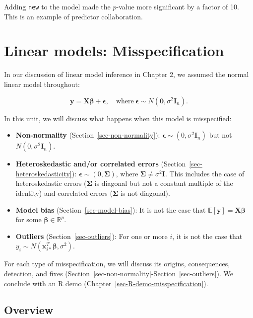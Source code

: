 \documentclass[
  11pt,
  letterpaper,
  oneside]{book}
\providecommand{\tightlist}{%
  \setlength{\itemsep}{0pt}\setlength{\parskip}{0pt}}\usepackage{longtable,booktabs,array}
\theoremstyle{definition}
\theoremstyle{plain}
\theoremstyle{plain}
\theoremstyle{plain}
\theoremstyle{remark}
\begin{document}
Adding \texttt{new} to the model made the \(p\)-value more significant
by a factor of 10. This is an example of predictor collaboration.

\part{Linear models: Misspecification}

In our discussion of linear model inference in Chapter 2, we assumed the
normal linear model throughout:

\[
\boldsymbol{y} = \boldsymbol{X} \boldsymbol{\beta} + \boldsymbol{\epsilon}, \quad \text{where} \ \boldsymbol{\epsilon} \sim N(\boldsymbol{0}, \sigma^2 \boldsymbol{I}_n).
\]

In this unit, we will discuss what happens when this model is
misspecified:

\begin{itemize}
\tightlist
\item
  \textbf{Non-normality} (Section~\ref{sec-non-normality}):
  \(\boldsymbol{\epsilon} \sim (0, \sigma^2 \boldsymbol{I}_n)\) but not
  \(N(0, \sigma^2 \boldsymbol{I}_n)\).
\item
  \textbf{Heteroskedastic and/or correlated errors}
  (Section~\ref{sec-heteroskedasticity}):
  \(\boldsymbol{\epsilon} \sim (0, \boldsymbol{\Sigma})\), where
  \(\boldsymbol{\Sigma} \neq \sigma^2 \boldsymbol{I}\). This includes
  the case of heteroskedastic errors (\(\boldsymbol{\Sigma}\) is
  diagonal but not a constant multiple of the identity) and correlated
  errors (\(\boldsymbol{\Sigma}\) is not diagonal).
\item
  \textbf{Model bias} (Section~\ref{sec-model-bias}): It is not the case
  that
  \(\mathbb{E}[\boldsymbol{y}] = \boldsymbol{X} \boldsymbol{\beta}\) for
  some \(\boldsymbol{\beta} \in \mathbb{R}^p\).
\item
  \textbf{Outliers} (Section~\ref{sec-outliers}): For one or more \(i\),
  it is not the case that
  \(y_i \sim N(\boldsymbol{x}_{i*}^T \boldsymbol{\beta}, \sigma^2)\).
\end{itemize}

For each type of misspecification, we will discuss its origins,
consequences, detection, and fixes
(Section~\ref{sec-non-normality}-Section~\ref{sec-outliers}). We
conclude with an R demo (Chapter~\ref{sec-R-demo-misspecification}).

\hypertarget{overview}{%
\chapter{Overview}\label{overview}}
\end{document}
